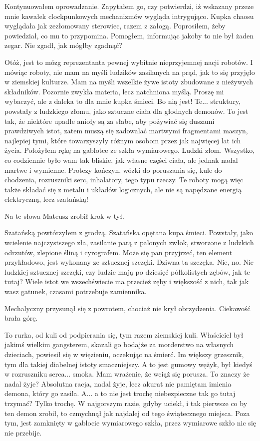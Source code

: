 Kontynuowałem oprowadzanie.
Zapytałem go, czy potwierdzi, iż wskazany przeze mnie kawałek clockpunkowych mechanizmów wygląda intrygująco.
Kupka chaosu wyglądała jak zezłomowany sterowiec, razem z załogą.
Poprosiłem, żeby powiedział, co mu to przypomina. Pomogłem, informując jakoby to nie był żaden zegar.
Nie zgadł, jak mógłby zgadnąć?
\begin{dialogue}
\ds{} Otóż, jest to mózg reprezentanta pewnej wybitnie nieprzyjemnej nacji robotów.
I mówiąc roboty, nie mam na myśli ludzików zasilanych na prąd, jak to się przyjęło w ziemskiej kulturze.
Mam na myśli wszelkie żywe istoty zbudowane z nieżywych składników. Pozornie zwykła materia, lecz natchniona myślą.
\ds{} Proszę mi wybaczyć, ale z daleka to dla mnie kupka śmieci.
\ds{} Bo nią jest!
Te... struktury, powstały z ludzkiego złomu, jako sztuczne ciała dla głodnych demonów.
To jest tak, że niektóre upadłe anioły są za słabe, aby pożywiać się duszami prawdziwych istot, 
zatem muszą się zadowalać martwymi fragmentami maszyn, najlepiej tymi, które towarzyszyły różnym osobom przez jak najwięcej lat ich życia.
\dm{} Położyłem rękę na gablotce ze szkła wymiarowego. \dm{}
Ludzki złom. Wszystko, co codziennie było wam tak bliskie, jak własne części ciała, ale jednak nadal martwe i wymienne. 
Protezy kończyn, wózki do poruszania się, kule do chodzenia, rozruszniki serc, inhalatory, tego typu rzeczy.
Te roboty mogą więc także składać się z metalu i układów logicznych, ale nie są napędzane energią elektryczną, lecz szatańską!
\end{dialogue}
Na te słowa Mateusz zrobił krok w tył.
\begin{dialogue}
\ds{} Szatańską \dm{} powtórzyłem z grodzą. \dm{} Szatańska opętana kupa śmieci.
Powstały, jako wcielenie najczystszego zła, zasilanie parą z palonych zwłok, stworzone z ludzkich odrzutów, zlepione śliną i cyrografem.
Może się pan przyjrzeć, ten element przykładowo, jest wykonany ze sztucznej szczęki.
\ds{} Dziwna ta szczęka.
\ds{} Nie, no. Nie ludzkiej sztucznej szczęki, czy ludzie mają po dziesięć półkolistych zębów, jak te tutaj?
Wiele istot we wszechświecie ma przecież zęby i większość z nich, tak jak wasz gatunek, czasami potrzebuje zamiennika.
\end{dialogue}
Mechalyczny przysunął się z powrotem, chociaż nie krył obrzydzenia. Ciekawość brała górę.
\begin{dialogue}
\ds{} To rurka, od kuli od podpierania się, tym razem ziemskiej kuli. 
Właściciel był jakimś wielkim gangsterem, skazali go bodajże za morderstwo na własnych dzieciach, powiesił się w więzieniu, oczekując na śmierć.
Im większy grzesznik, tym dla takiej diabelnej istoty smaczniejszy.
A to jest gumowy wężyk, był kiedyś w rozruszniku serca... smoka.
\ds{} Mam wrażenie, że wciąż się porusza. To znaczy że nadal żyje?
\ds{} Absolutna racja, nadal żyje, lecz akurat nie pamiętam imienia demona, który go zasila.
\ds{} A... a to nie jest trochę niebezpieczne tak go tutaj trzymać?
\ds{} Tylko trochę. W najgorszym razie, gdyby uciekł, i tak pierwsze co by ten demon zrobił, to czmychnął jak najdalej od tego świątecznego miejsca. 
Poza tym, jest zamknięty w gablocie wymiarowego szkła, przez wymiarowe szkło nic się nie przebije.
\end{dialogue}

